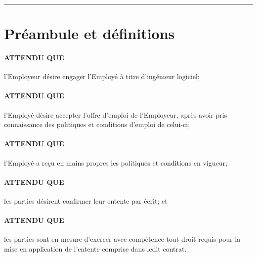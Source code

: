 \documentclass{article}
\begin{document}
    \hrule
    
    \section{Préambule et définitions}
    
    \paragraph{ATTENDU QUE} l'Employeur désire engager l'Employé à titre d'ingénieur logiciel;
    \paragraph{ATTENDU QUE} l'Employé désire accepter l'offre d'emploi de l'Employeur, après avoir pris connaissance des politiques et conditions d'emploi de celui-ci;
    \paragraph{ATTENDU QUE} l'Employé a reçu en mains propres les politiques et conditions en vigueur;
    \paragraph{ATTENDU QUE} les parties désirent confirmer leur entente par écrit; et
    \paragraph{ATTENDU QUE} les parties sont en mesure d'exercer avec compétence tout droit requis pour la mise en application de l'entente comprise dans ledit contrat.
    
    
    \vfill%
    {\centering%
    \par}%
    \vfill
    
    \pagebreak
    
    
    
\end{document}

